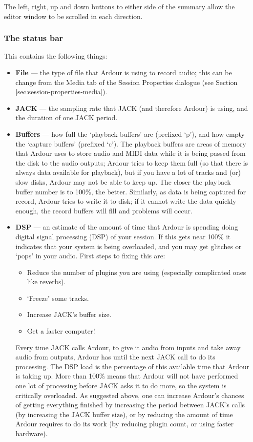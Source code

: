 \documentclass[10pt,a4paper]{book}
\newcommand{\tab}[1]{#1}
\begin{document}
The left, right, up and down buttons to either side of the summary
allow the editor window to be scrolled in each direction.

\subsubsection{The status bar}

This contains the following things:
\begin{itemize}
\item \textbf{File} --- the type of file that Ardour is using to record audio;
  this can be change from the \tab{Media} tab of the Session
  Properties dialogue (see Section
  \ref{sec:session-properties-media}).
\item \textbf{JACK} --- the sampling rate that JACK (and therefore Ardour) is
  using, and the duration of one JACK period.
\item \textbf{Buffers} --- how full the `playback buffers' are (prefixed `p'),
  and how empty the `capture buffers' (prefixed `c').  The playback
  buffers are areas of memory that Ardour uses to store audio and MIDI
  data while it is being passed from the disk to the audio outputs;
  Ardour tries to keep them full (so that there is always data
  available for playback), but if you have a lot of tracks and (or)
  slow disks, Ardour may not be able to keep up.  The closer the
  playback buffer number is to 100\%, the better.  Similarly, as data
  is being captured for record, Ardour tries to write it to disk; if
  it cannot write the data quickly enough, the record buffers will
  fill and problems will occur.
\item {} \textbf{DSP} --- an estimate of the amount of time
  that Ardour is spending doing digital signal processing (DSP) of
  your session.  If this gets near 100\% it indicates that your system
  is being overloaded, and you may get glitches or `pops' in your
  audio.  First steps to fixing this are:
\begin{itemize}
\item Reduce the number of plugins you are using (especially
  complicated ones like reverbs).
\item `Freeze' some tracks.
\item Increase JACK's buffer size.
\item Get a faster computer!
\end{itemize}

\begin{danger}
Every time JACK calls Ardour, to give it audio from inputs and take
away audio from outputs, Ardour has until the next JACK call to do its
processing.  The DSP load is the percentage of this available time
that Ardour is taking up.  More than 100\% means that Ardour will not
have performed one lot of processing before JACK asks it to do more,
so the system is critically overloaded.  As suggested above, one can
increase Ardour's chances of getting everything finished by increasing
the period between JACK's calls (by increasing the JACK buffer size),
or by reducing the amount of time Ardour requires to do its work (by
reducing plugin count, or using faster hardware).
\end{danger}


\end{itemize}
\end{document}
